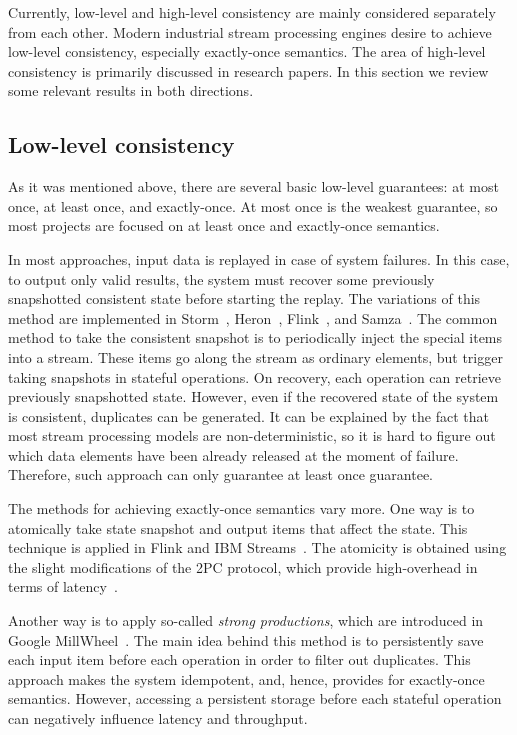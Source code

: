 \label{fs-phd-related}

Currently, low-level and high-level consistency are mainly considered separately from each other. Modern industrial stream processing engines desire to achieve low-level consistency, especially exactly-once semantics. The area of high-level consistency is primarily discussed in research papers. In this section we review some relevant results in both directions. 

\subsection{Low-level consistency}
As it was mentioned above, there are several basic low-level guarantees: at most once, at least once, and exactly-once. At most once is the weakest guarantee, so most projects are focused on at least once and exactly-once semantics.

In most approaches, input data is replayed in case of system failures. In this case, to output only valid results, the system must recover some previously snapshotted consistent state before starting the replay. The variations of this method are implemented in Storm~\cite{apache:storm}, Heron~\cite{Kulkarni:2015:THS:2723372.2742788}, Flink~\cite{Carbone:2017:SMA:3137765.3137777}, and Samza~\cite{Noghabi:2017:SSS:3137765.3137770}. The common method to take the consistent snapshot is to periodically inject the special items into a stream. These items go along the stream as ordinary elements, but trigger taking snapshots in stateful operations. On recovery, each operation can retrieve previously snapshotted state. However, even if the recovered state of the system is consistent, duplicates can be generated. It can be explained by the fact that most stream processing models are non-deterministic, so it is hard to figure out which data elements have been already released at the moment of failure. Therefore, such approach can only guarantee at least once guarantee. 

The methods for achieving exactly-once semantics vary more. One way is to atomically take state snapshot and output items that affect the state. This technique is applied in Flink and IBM Streams~\cite{jacques2016consistent}. The atomicity is obtained using the slight modifications of the 2PC protocol, which provide high-overhead in terms of latency~\cite{we2018beyondmr}.

Another way is to apply so-called {\em strong productions}, which are introduced in Google MillWheel~\cite{Akidau:2013:MFS:2536222.2536229}. The main idea behind this method is to persistently save each input item before each operation in order to filter out duplicates. This approach makes the system idempotent, and, hence, provides for exactly-once semantics. However, accessing a persistent storage before each stateful operation can negatively influence latency and throughput.

